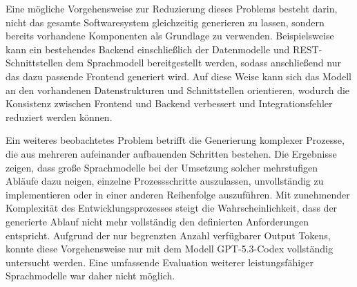 Eine mögliche Vorgehensweise zur Reduzierung dieses Problems besteht darin, nicht das gesamte Softwaresystem gleichzeitig generieren zu lassen, sondern bereits vorhandene Komponenten als Grundlage zu verwenden. Beispielsweise kann ein bestehendes Backend einschließlich der Datenmodelle und REST-Schnittstellen dem Sprachmodell bereitgestellt werden, sodass anschließend nur das dazu passende Frontend generiert wird. Auf diese Weise kann sich das Modell an den vorhandenen Datenstrukturen und Schnittstellen orientieren, wodurch die Konsistenz zwischen Frontend und Backend verbessert und Integrationsfehler reduziert werden können.

Ein weiteres beobachtetes Problem betrifft die Generierung komplexer Prozesse, die aus mehreren aufeinander aufbauenden Schritten bestehen. Die Ergebnisse zeigen, dass große Sprachmodelle bei der Umsetzung solcher mehrstufigen Abläufe dazu neigen, einzelne Prozessschritte auszulassen, unvollständig zu implementieren oder in einer anderen Reihenfolge auszuführen. Mit zunehmender Komplexität des Entwicklungsprozesses steigt die Wahrscheinlichkeit, dass der generierte Ablauf nicht mehr vollständig den definierten Anforderungen entspricht.
Aufgrund der nur begrenzten Anzahl verfügbarer Output Tokens, konnte diese Vorgehensweise nur mit dem Modell GPT-5.3-Codex  vollständig untersucht werden. Eine umfassende Evaluation weiterer leistungsfähiger Sprachmodelle war daher nicht möglich.

